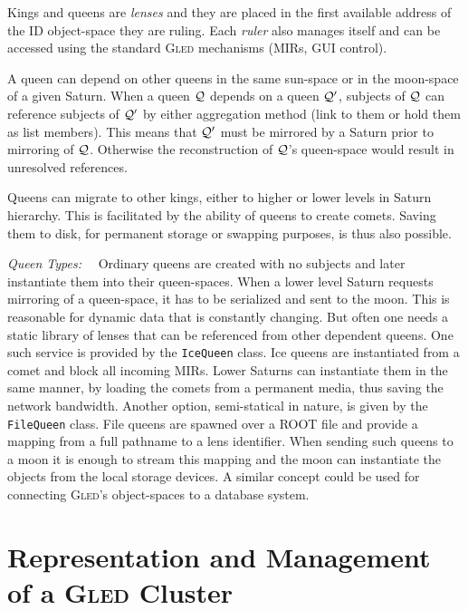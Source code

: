 \documentclass[final]{siamltex}
\def\gled{\textsc{Gled}\xspace}
\def\smalltt#1{{\small\texttt{#1}}}
\begin{document}
Kings and queens are \emph{lenses} and they are placed in the first
available address of the ID object-space they are ruling. Each
\emph{ruler} also manages itself and can be accessed using the
standard \gled mechanisms (MIRs, GUI control).

A queen can depend on other queens in the same sun-space or in the
moon-space of a given Saturn. When a queen ${\cal Q}$ depends on a
queen ${\cal Q}'$, subjects of ${\cal Q}$ can reference subjects of
${\cal Q}'$ by either aggregation method (link to them or hold them as
list members). This means that ${\cal Q}'$ must be mirrored by a
Saturn prior to mirroring of ${\cal Q}$.  Otherwise the reconstruction
of ${\cal Q}$'s queen-space would result in unresolved references.

Queens can migrate to other kings, either to higher or lower levels in
Saturn hierarchy. This is facilitated by the ability of queens to
create comets. Saving them to disk, for permanent storage or swapping
purposes, is thus also possible.

\emph{Queen Types:}\ \ 
Ordinary queens are created with no subjects and later instantiate
them into their queen-spaces. When a lower level Saturn requests
mirroring of a queen-space, it has to be serialized and sent to the
moon. This is reasonable for dynamic data that is constantly changing.
But often one needs a static library of lenses that can be
referenced from other dependent queens. One such service is provided
by the \smalltt{IceQueen} class. Ice queens are instantiated from a
comet and block all incoming MIRs. Lower Saturns can instantiate them
in the same manner, by loading the comets from a permanent media, thus
saving the network bandwidth. Another option, semi-statical in
nature, is given by the \smalltt{FileQueen} class. File queens are
spawned over a ROOT file and provide a mapping from a full pathname to
a lens identifier. When sending such queens to a moon it is enough to
stream this mapping and the moon can instantiate the objects from the
local storage devices. A similar concept could be used for
connecting \gled's object-spaces to a database system.


\section{Representation and Management of a \gled Cluster}
\end{document}
